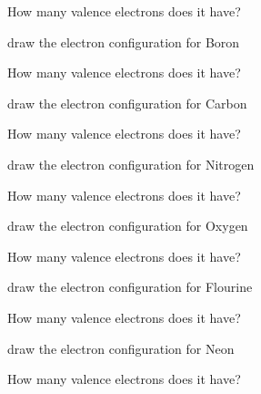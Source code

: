 \documentclass[12pt]{exam}
\begin{document}
\begin{questions}
How many valence electrons does it have? \fillin[1][1cm]


\question draw the electron configuration for Boron  

How many valence electrons does it have? \fillin[1][1cm]

\question draw the electron configuration for Carbon  

How many valence electrons does it have? \fillin[1][1cm]

\question draw the electron configuration for Nitrogen  

How many valence electrons does it have? \fillin[1][1cm]

\question draw the electron configuration for Oxygen  

How many valence electrons does it have? \fillin[1][1cm]

\question draw the electron configuration for Flourine  

How many valence electrons does it have? \fillin[1][1cm]

\question draw the electron configuration for Neon  

How many valence electrons does it have? \fillin[8][1cm]
\end{questions}


\pagebreak

\vspace{3cm}

\end{document}
